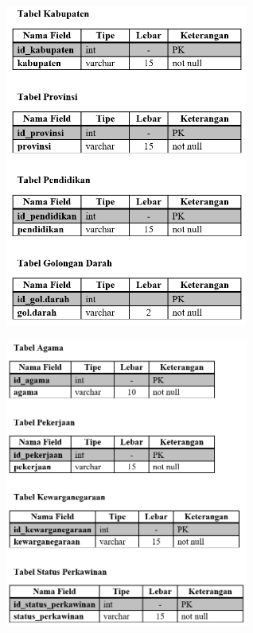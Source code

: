 \begin{figure}[H]
	\centering
	\includegraphics[width=8cm]{figures/tabel3.png}
\end{figure}
\begin{figure}[H]
	\centering
	\includegraphics[width=8cm]{figures/tabel4.png}
\end{figure}

